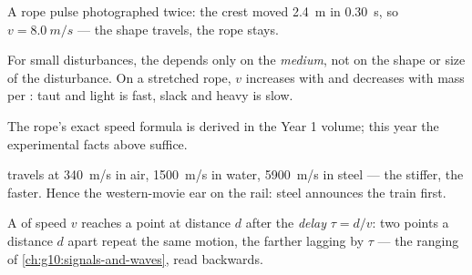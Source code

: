 \begin{omfigure}

{\small A rope pulse photographed twice: the crest moved \qty{2.4}{m}
in \qty{0.30}{s}, so $v = \qty{8.0}{m/s}$ --- the shape travels, the
rope stays.}
\end{omfigure}

\begin{proposition}\label{prop:g12:mechanical-waves:medium}
For small disturbances, the  depends only on the
\emph{medium}, not on the shape or size of the disturbance. On a
stretched rope, $v$ increases with  and decreases with mass per
: taut and light is fast, slack and heavy is slow. \admitted
\end{proposition}

\begin{remark}\label{rem:g12:mechanical-waves:ropeformula}
The rope's exact speed formula is derived in the Year 1 volume; this
year the experimental facts above suffice.
\end{remark}

\begin{example}\label{ex:g12:mechanical-waves:speeds}
 travels at \qty{340}{m/s} in air, \qty{1500}{m/s} in water,
\qty{5900}{m/s} in steel --- the stiffer, the faster. Hence the
western-movie ear on the rail: steel announces the train first.
\end{example}

\begin{definition}[Delay]\label{def:g12:mechanical-waves:delay}
A  of speed $v$ reaches a point at distance $d$ after the
\emph{delay} $\tau = d/v$: two points a distance $d$
apart repeat the same motion, the farther lagging by $\tau$ --- the
 ranging of \cref{ch:g10:signals-and-waves}, read backwards.
\end{definition}

